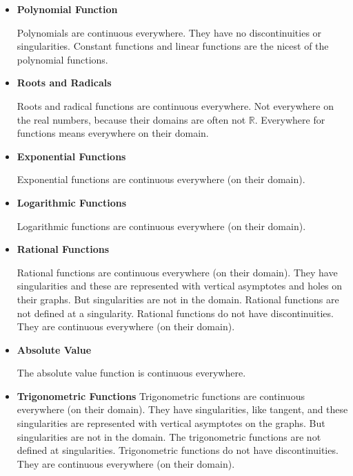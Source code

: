 \documentclass{ximera}
\begin{document}
\begin{itemize} 

\item \textbf{Polynomial Function}  

Polynomials are continuous everywhere. They have no discontinuities or singularities. Constant functions and linear functions are the nicest of the polynomial functions.






\item \textbf{Roots and Radicals}

Roots and radical functions are continuous everywhere.  Not everywhere on the real numbers, because their domains are often not $\mathbb{R}$. Everywhere for functions means everywhere on their domain.






\item \textbf{Exponential Functions}

Exponential functions are continuous everywhere (on their domain).





\item \textbf{Logarithmic Functions}

Logarithmic functions are continuous everywhere (on their domain).






\item \textbf{Rational Functions}

Rational functions are continuous everywhere (on their domain).  They have singularities and these are represented with vertical asymptotes and holes on their graphs.  But singularities are not in the domain.  Rational functions are not defined at a singularity. Rational functions do not have discontinuities.  They are continuous everywhere (on their domain). 





\item \textbf{Absolute Value}

The absolute value function is continuous everywhere.







\item \textbf{Trigonometric Functions}
Trigonometric functions are continuous everywhere (on their domain).  They have singularities, like tangent, and these singularities are represented with vertical asymptotes on the graphs.  But singularities are not in the domain.  The trigonometric functions are not defined at singularities. Trigonometric functions do not have discontinuities.  They are continuous everywhere (on their domain). 








\end{itemize}
\end{document}
